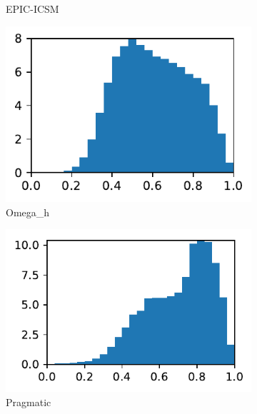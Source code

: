 \documentclass[3p,times,procedia,number]{elsarticle}
\begin{document}
\begin{figure}
\begin{subfigure}{.16\textwidth}
\caption{EPIC-ICSM}
\end{subfigure}
\begin{subfigure}{.16\textwidth}
\centering
\includegraphics[width=\textwidth]{omega_h-cube-cylinder-polar-1-quality.pdf}
\caption{Omega\_h}
\label{fig:omega_h-cube-cylinder-polar-1-quality}
\end{subfigure}
\begin{subfigure}{.16\textwidth}
\centering
\includegraphics[width=\textwidth]{pragmatic-cube-cylinder-polar-1-quality.pdf}
\caption{Pragmatic}
\end{subfigure}
\begin{subfigure}{.16\textwidth}
\centering

\end{subfigure}
\end{figure}
\end{document}
